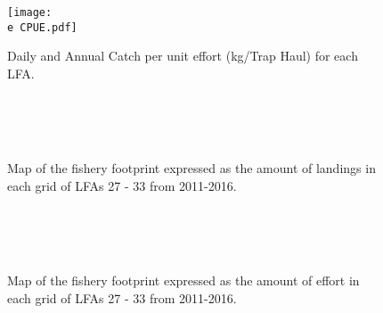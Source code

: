 \documentclass[11pt]{article}
\newcommand{\e}{\string~/bio.data/bio.lobster/figures/LFA2733Framework2018/} %
\begin{document}
    \begin{figure}
    \centering
        \texttt{[image: \\e CPUE.pdf]}
        \caption{Daily and Annual Catch per unit effort (kg/Trap Haul) for each LFA.}

    \end{figure}

        \begin{figure}
        \centering
                \\
                \\
                \\
        
         \caption{Map of the fishery footprint expressed as the amount of landings in each grid of LFAs 27 - 33 from 2011-2016.}
        \end{figure}

        \begin{figure}
        \centering
                \\
                \\
                \\
        
         \caption{Map of the fishery footprint expressed as the amount of effort in each grid of LFAs 27 - 33 from 2011-2016.}
        \end{figure}
\end{document}
